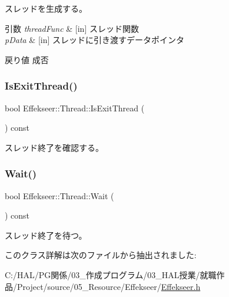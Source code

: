 スレッドを生成する。 


\begin{DoxyParams}{引数}
{\em thread\+Func} & \mbox{[}in\mbox{]} スレッド関数 \\
\hline
{\em p\+Data} & \mbox{[}in\mbox{]} スレッドに引き渡すデータポインタ \\
\hline
\end{DoxyParams}
\begin{DoxyReturn}{戻り値}
成否 
\end{DoxyReturn}
\mbox{\label{class_effekseer_1_1_thread_a0fb87aa53d905bfadd1c0df29877b97d}} 
\subsubsection{\texorpdfstring{Is\+Exit\+Thread()}{IsExitThread()}}
{\footnotesize\ttfamily bool Effekseer\+::\+Thread\+::\+Is\+Exit\+Thread (\begin{DoxyParamCaption}{ }\end{DoxyParamCaption}) const}



スレッド終了を確認する。 

\mbox{\label{class_effekseer_1_1_thread_a1a5806df4d7bdd6dc0a0e25986f75d78}} 
\subsubsection{\texorpdfstring{Wait()}{Wait()}}
{\footnotesize\ttfamily bool Effekseer\+::\+Thread\+::\+Wait (\begin{DoxyParamCaption}{ }\end{DoxyParamCaption}) const}



スレッド終了を待つ。 



このクラス詳解は次のファイルから抽出されました\+:\begin{DoxyCompactItemize}
\item 
C\+:/\+H\+A\+L/\+P\+G関係/03\+\_\+作成プログラム/03\+\_\+\+H\+A\+L授業/就職作品/\+Project/source/05\+\_\+\+Resource/\+Effekseer/\mbox{\hyperlink{_effekseer_8h}{Effekseer.\+h}}\end{DoxyCompactItemize}

